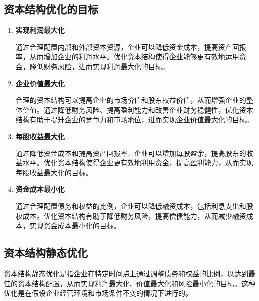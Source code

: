\subsection{资本结构优化的目标}
\begin{enumerate}[label=(\arabic*)]
\item \textbf{实现利润最大化}

通过合理配置内部和外部资本资源，企业可以降低资金成本，提高资产回报率，从而增加企业的利润水平。优化资本结构使得企业能够更有效地运用资金，降低财务风险，进而实现利润最大化的目标。
\item \textbf{企业价值最大化}

合理的资本结构可以提高企业的市场价值和股东权益价值，从而增强企业的整体价值。通过降低财务风险、提高盈利能力和改善企业财务稳健性，优化资本结构有助于提升企业的竞争力和市场地位，进而实现企业价值最大化的目标。
\item \textbf{每股收益最大化}

通过降低资金成本和提高资产回报率，企业可以增加每股盈余，提高股东的收益水平。优化资本结构使得企业更有效地利用资金，提高盈利能力，从而实现每股收益最大化的目标。
\item \textbf{资金成本最小化}

通过合理配置债务和权益的比例，企业可以降低融资成本，包括利息支出和股权成本。优化资本结构有助于降低财务风险，提高偿债能力，从而减少融资成本，实现资金成本最小化的目标。
\end{enumerate}
\subsection{资本结构静态优化}
资本结构静态优化是指企业在特定时间点上通过调整债务和权益的比例，以达到最佳的资本结构配置，从而实现利润最大化、价值最大化和风险最小化的目标。这种优化是在假设企业经营环境和市场条件不变的情况下进行的。

